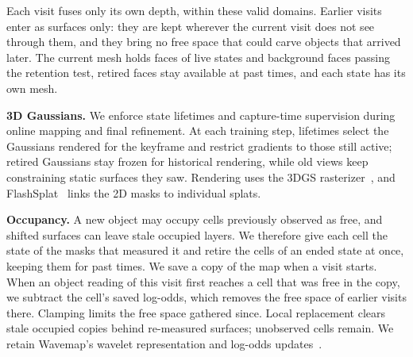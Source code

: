 \documentclass[10pt,twocolumn,letterpaper]{article}
\begin{document}
Each visit fuses only its own depth, within these valid domains. Earlier visits enter as surfaces only: they are kept wherever the current visit does not see through them, and they bring no free space that could carve objects that arrived later. The current mesh holds faces of live states and background faces passing the retention test, retired faces stay available at past times, and each state has its own mesh.

\vspace{0mm}\noindent\textbf{3D Gaussians.}
We enforce state lifetimes and capture-time supervision during online mapping and final refinement. At each training
step, lifetimes select the Gaussians rendered for the keyframe and restrict gradients to those still active; retired
Gaussians stay frozen for historical rendering, while old views keep constraining static surfaces they saw. Rendering
uses the 3DGS rasterizer~\cite{10.1145/3592433}, and FlashSplat~\cite{10.1007/978-3-031-72670-5_26} links the 2D masks to individual splats.

\vspace{0mm}\noindent\textbf{Occupancy.}
A new object may occupy cells previously observed as free, and shifted surfaces can leave stale occupied layers.
We therefore give each cell the state of the masks that measured it and retire the cells of an ended state at once, keeping them for past times.
We save a copy of the map when a visit starts. When an object reading of this visit first reaches a cell that was free in the copy, we subtract the cell's saved log-odds, which removes the free space of earlier visits there. Clamping limits the free space gathered since. Local replacement clears stale occupied copies behind re-measured surfaces; unobserved cells remain. We retain Wavemap's wavelet representation and log-odds
updates~\cite{Reijgwart-RSS-23,10.1007/s10514-012-9321-0}.


\setlength{\textfloatsep}{12pt plus 2pt minus 2pt}
\setlength{\dbltextfloatsep}{12pt plus 2pt minus 2pt}
\setlength{\floatsep}{8pt plus 2pt minus 2pt}
\setlength{\dblfloatsep}{8pt plus 2pt minus 2pt}
\end{document}
